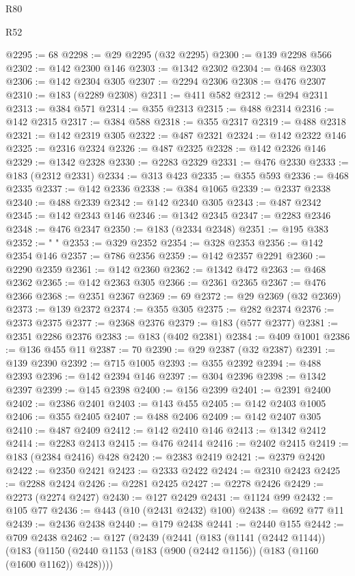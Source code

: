 \begin{lexlean}{R80}
\begin{lexlean}{R52}
\begin{coremodule}
{{{{{{{{{{{{{{{{{{{{{{{{{{{{{{{{{{{{{{{{{{{{{{{{{{{{{{{{{{{{{{{{{{{{{{{{{{{{{{{{{{{{{{{{{{{{{{{{{{{{{{{{{{{{{{{{{{{{{{{{{{{{{{{{{{{{{{{{{{{{{{{{{{{{{{{{{{{{{{{{{{{{{{{{{{{{{{{{{{{{{{{{{{{{{{{{{{{{{{@2295 := 68
@2298 := @29 @2295 (@32 @2295)
@2300 := @139 @2298 @566
@2302 := @142 @2300 @146
@2303 := @1342 @2302
@2304 := @468 @2303
@2306 := @142 @2304 @305
@2307 := @2294 @2306
@2308 := @476 @2307
@2310 := @183 (@2289 @2308)
@2311 := @411 @582
@2312 := @294 @2311
@2313 := @384 @571
@2314 := @355 @2313
@2315 := @488 @2314
@2316 := @142 @2315
@2317 := @384 @588
@2318 := @355 @2317
@2319 := @488 @2318
@2321 := @142 @2319 @305
@2322 := @487 @2321
@2324 := @142 @2322 @146
@2325 := @2316 @2324
@2326 := @487 @2325
@2328 := @142 @2326 @146
@2329 := @1342 @2328
@2330 := @2283 @2329
@2331 := @476 @2330
@2333 := @183 (@2312 @2331)
@2334 := @313 @423
@2335 := @355 @593
@2336 := @468 @2335
@2337 := @142 @2336
@2338 := @384 @1065
@2339 := @2337 @2338
@2340 := @488 @2339
@2342 := @142 @2340 @305
@2343 := @487 @2342
@2345 := @142 @2343 @146
@2346 := @1342 @2345
@2347 := @2283 @2346
@2348 := @476 @2347
@2350 := @183 (@2334 @2348)
@2351 := @195 @383
@2352 := " "
@2353 := @329 @2352
@2354 := @328 @2353
@2356 := @142 @2354 @146
@2357 := @786 @2356
@2359 := @142 @2357 @2291
@2360 := @2290 @2359
@2361 := @142 @2360
@2362 := @1342 @472
@2363 := @468 @2362
@2365 := @142 @2363 @305
@2366 := @2361 @2365
@2367 := @476 @2366
@2368 := @2351 @2367
@2369 := 69
@2372 := @29 @2369 (@32 @2369)
@2373 := @139 @2372
@2374 := @355 @305
@2375 := @282 @2374
@2376 := @2373 @2375
@2377 := @2368 @2376
@2379 := @183 (@577 @2377)
@2381 := @2351 @2286 @2376
@2383 := @183 (@402 @2381)
@2384 := @409 @1001
@2386 := @136 @455 @11
@2387 := 70
@2390 := @29 @2387 (@32 @2387)
@2391 := @139 @2390
@2392 := @715 @1005
@2393 := @355 @2392
@2394 := @488 @2393
@2396 := @142 @2394 @146
@2397 := @304 @2396
@2398 := @1342 @2397
@2399 := @145 @2398
@2400 := @156 @2399
@2401 := @2391 @2400
@2402 := @2386 @2401
@2403 := @143 @455
@2405 := @142 @2403 @1005
@2406 := @355 @2405
@2407 := @488 @2406
@2409 := @142 @2407 @305
@2410 := @487 @2409
@2412 := @142 @2410 @146
@2413 := @1342 @2412
@2414 := @2283 @2413
@2415 := @476 @2414
@2416 := @2402 @2415
@2419 := @183 (@2384 @2416) @428
@2420 := @2383 @2419
@2421 := @2379 @2420
@2422 := @2350 @2421
@2423 := @2333 @2422
@2424 := @2310 @2423
@2425 := @2288 @2424
@2426 := @2281 @2425
@2427 := @2278 @2426
@2429 := @2273 (@2274 @2427)
@2430 := @127 @2429
@2431 := @1124 @99
@2432 := @105 @77
@2436 := @443 (@10 (@2431 @2432) @100)
@2438 := @692 @77 @11
@2439 := @2436 @2438
@2440 := @179 @2438
@2441 := @2440 @155
@2442 := @709 @2438
@2462 := @127
    (@2439
      (@2441
        (@183
          (@1141 (@2442 @1144))
          (@183
            (@1150 (@2440 @1153 (@183 (@900 (@2442 @1156)) (@183 (@1160 (@1600 @1162)) @428))))
}}}}}}}}}}}}}}}}}}}}}}}}}}}}}}}}}}}}}}}}}}}}}}}}}}}}}}}}}}}}}}}}}}}}}}}}}}}}}}}}}}}}}}}}}}}}}}}}}}}}}}}}}}}}}}}}}}}}}}}}}}}}}}}}}}}}}}}}}}}}}}}}}}}}}}}}}}}}}}}}}}}}}}}}}}}}}}}}}}}}}}}}}}}}}}}}}}}}}}
\end{coremodule}
\end{lexlean}
\end{lexlean}
